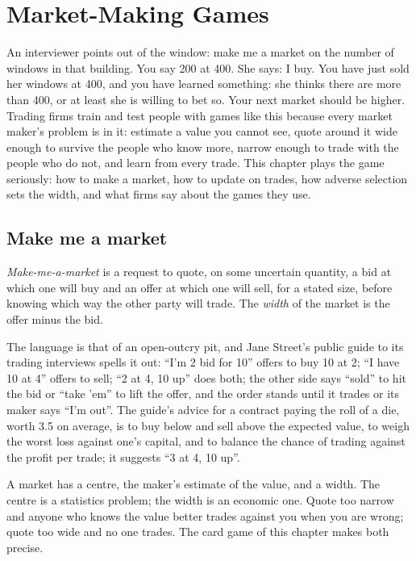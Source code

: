 \chapter{Market-Making Games}\label{ch:m2:market-making-games}

An interviewer points out of the window: make me a market on the number of windows in
that building. You say 200 at 400. She says: I buy. You have just sold her windows at 400,
and you have learned something: she thinks there are more than 400, or at least she is
willing to bet so. Your next market should be higher. Trading firms train and test
people with games like this because every market maker's problem is in it: estimate a
value you cannot see, quote around it wide enough to survive the people who know more,
narrow enough to trade with the people who do not, and learn from every trade. This
chapter plays the game seriously: how to make a market, how to update on trades, how
adverse selection sets the width, and what firms say about the games they use.

\section{Make me a market}

\begin{definition}\label{def:m2:market-making-games:mmam}
\emph{Make-me-a-market} is a request to quote, on some uncertain
quantity, a bid at which one will buy and an offer at which one will sell, for a stated
size, before knowing which way the other party will trade. The \emph{width}
of the market is the offer minus the bid.
\end{definition}

The language is that of an open-outcry pit, and Jane Street's public guide to its trading
interviews spells it out: ``I'm 2 bid for 10'' offers to buy 10 at 2; ``I have 10 at 4''
offers to sell; ``2 at 4, 10 up'' does both; the other side says ``sold'' to hit the bid or
``take 'em'' to lift the offer, and the order stands until it trades or its maker says
``I'm out''. The guide's advice for a contract paying the roll of a die, worth 3.5 on
average, is to buy below and sell above the expected value, to weigh the worst loss
against one's capital, and to balance the chance of trading against the profit per
trade; it suggests ``3 at 4, 10 up''.

A market has a centre, the maker's estimate of the value, and a width. The centre is a
statistics problem; the width is an economic one. Quote too narrow and anyone who knows
the value better trades against you when you are wrong; quote too wide and no one
trades. The card game of this chapter makes both precise.

